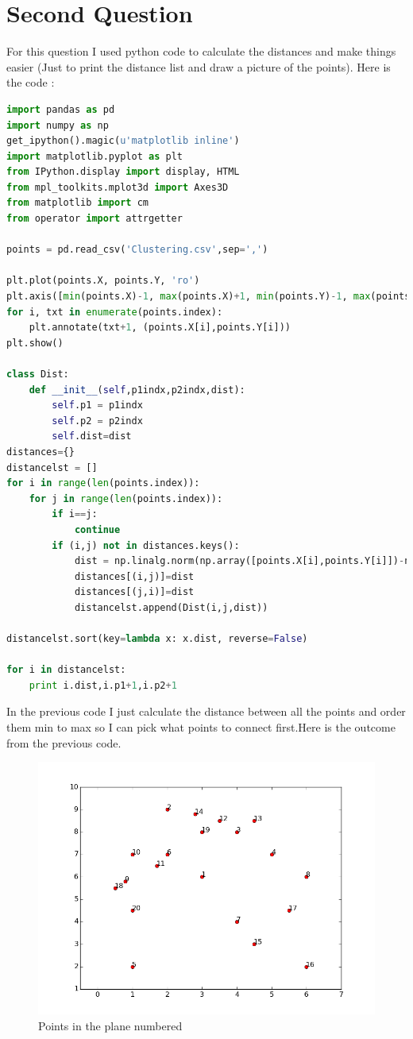 \documentclass{article}
\begin{document}
\section*{Second Question}
For this question I used python code to calculate the distances and make things easier (Just to print the distance list and draw a picture of the points). Here is the code : 
\begin{lstlisting}[language=Python]
import pandas as pd
import numpy as np
get_ipython().magic(u'matplotlib inline')
import matplotlib.pyplot as plt
from IPython.display import display, HTML
from mpl_toolkits.mplot3d import Axes3D
from matplotlib import cm
from operator import attrgetter

points = pd.read_csv('Clustering.csv',sep=',')

plt.plot(points.X, points.Y, 'ro')
plt.axis([min(points.X)-1, max(points.X)+1, min(points.Y)-1, max(points.Y)+1])
for i, txt in enumerate(points.index):
    plt.annotate(txt+1, (points.X[i],points.Y[i]))
plt.show()

class Dist:
    def __init__(self,p1indx,p2indx,dist):
        self.p1 = p1indx
        self.p2 = p2indx
        self.dist=dist
distances={}
distancelst = []
for i in range(len(points.index)):
    for j in range(len(points.index)):
        if i==j:
            continue
        if (i,j) not in distances.keys():
            dist = np.linalg.norm(np.array([points.X[i],points.Y[i]])-np.array([points.X[j],points.Y[j]]))
            distances[(i,j)]=dist
            distances[(j,i)]=dist
            distancelst.append(Dist(i,j,dist))

distancelst.sort(key=lambda x: x.dist, reverse=False)

for i in distancelst:
    print i.dist,i.p1+1,i.p2+1
\end{lstlisting}
In the previous code I just calculate the distance between all the points and order them min to max so I can pick what points to connect first.Here is the outcome from the previous code.
\begin{figure}[H]
\includegraphics[scale=0.7]{q2points.png}
\caption{Points in the plane numbered}
\end{figure}
\end{document}
